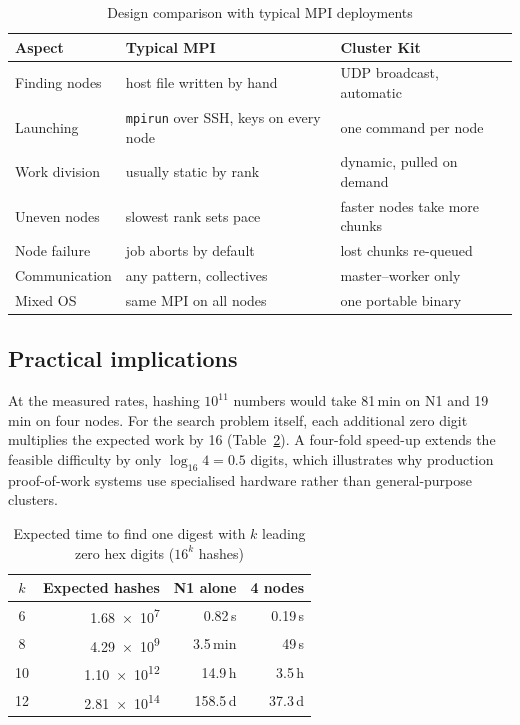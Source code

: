\documentclass[conference,10pt]{IEEEtran}
\begin{document}
\begin{table}[t]
\caption{Design comparison with typical MPI deployments}
\label{tab:mpi}
\centering\footnotesize
\setlength{\tabcolsep}{3pt}
\begin{tabular}{@{}>{\raggedright\arraybackslash}p{}>{\raggedright\arraybackslash}p{}>{\raggedright\arraybackslash}p{}@{}}
\toprule
Aspect & Typical MPI & Cluster Kit \\
\midrule
Finding nodes & host file written by hand & UDP broadcast, automatic \\
Launching & \texttt{mpirun} over SSH, keys on every node & one command per node \\
Work division & usually static by rank & dynamic, pulled on demand \\
Uneven nodes & slowest rank sets pace & faster nodes take more chunks \\
Node failure & job aborts by default & lost chunks re-queued \\
Communication & any pattern, collectives & master--worker only \\
Mixed OS & same MPI on all nodes & one portable binary \\
\bottomrule
\end{tabular}
\end{table}

\subsection{Practical implications}
At the measured rates, hashing $10^{11}$ numbers would take 81\,min on N1 and 19\,min on four nodes. For the search problem itself, each additional zero digit multiplies the expected work by 16 (Table~\ref{tab:kzeros}). A four-fold speed-up extends the feasible difficulty by only $\log_{16} 4 = 0.5$ digits, which illustrates why production proof-of-work systems use specialised hardware rather than general-purpose clusters.

\begin{table}[t]
\caption{Expected time to find one digest with $k$ leading zero hex digits ($16^k$ hashes)}
\label{tab:kzeros}
\centering
\begin{tabular}{@{}crrr@{}}
\toprule
$k$ & Expected hashes & N1 alone & 4 nodes \\
\midrule
6 & \num{1.68e7} & 0.82\,s & 0.19\,s \\
8 & \num{4.29e9} & 3.5\,min & 49\,s \\
10 & \num{1.10e12} & 14.9\,h & 3.5\,h \\
12 & \num{2.81e14} & 158.5\,d & 37.3\,d \\
\bottomrule
\end{tabular}
\end{table}
\end{document}

